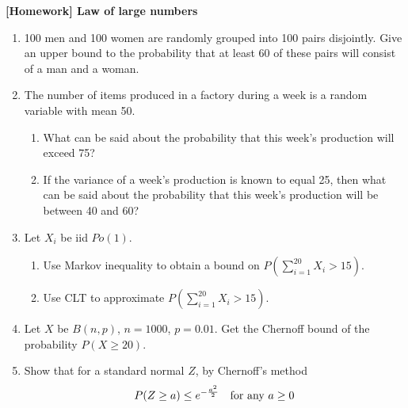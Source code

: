 \documentclass[12pt]{article}%
\newcommand{\0}{{\bf 0}}
\newcommand{\ra}[1]{\renewcommand{\arraystretch}{#1}}
\begin{document}
\newcommand{\ngi}{n \ra \infty}

\pagestyle{myheadings} 

\thispagestyle{plain}


\begin{center}
{\Large\bf [Homework] Law of large numbers} 
\end{center}




\begin{enumerate}
\item
100 men and 100 women are randomly grouped into 100 pairs disjointly. Give an upper bound to the probability that at least 60 of these pairs will consist of a man and a woman.








\item
The number of items produced in a factory during a week is a random variable with mean 50.
\begin{enumerate}
\item
What can be said about the probability that this week's production will exceed 75?
\item
If the variance of a week's production is known to equal 25, then what can be said about the probability that this week's production will be between 40 and 60?
\end{enumerate}

\item
Let $X_i$ be iid $Po(1)$.
\begin{enumerate}
\item
Use Markov inequality to obtain a bound on
$P(\sum_{i=1}^{20}X_i>15)$.
\item
Use CLT to approximate
$P(\sum_{i=1}^{20}X_i>15)$.
\end{enumerate}





\item  
Let $X$ be $B(n,p)$, $n=1000$, $p=0.01$. 
Get the Chernoff bound of the probability $P(X\ge 20)$.  








\item
Show that
for a standard normal $Z$, by Chernoff's method  
$$
P(Z\ge a)\le e^{-\frac{a^2}{2}}\quad \mbox{for any $a\ge 0$}
$$










\end{enumerate}
\end{document}
